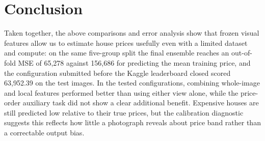 
\section{Conclusion}


Taken together, the above comparisons and error analysis show that frozen visual features allow us to estimate house prices usefully even with a limited dataset and compute: on the same five-group split the final ensemble reaches an out-of-fold MSE of 65,278 against 156,686 for predicting the mean training price, and the configuration submitted before the Kaggle leaderboard closed scored 63,952.39 on the test images. In the tested configurations, combining whole-image and local features performed better than using either view alone, while the price-order auxiliary task did not show a clear additional benefit. Expensive houses are still predicted low relative to their true prices, but the calibration diagnostic suggests this reflects how little a photograph reveals about price band rather than a correctable output bias.
